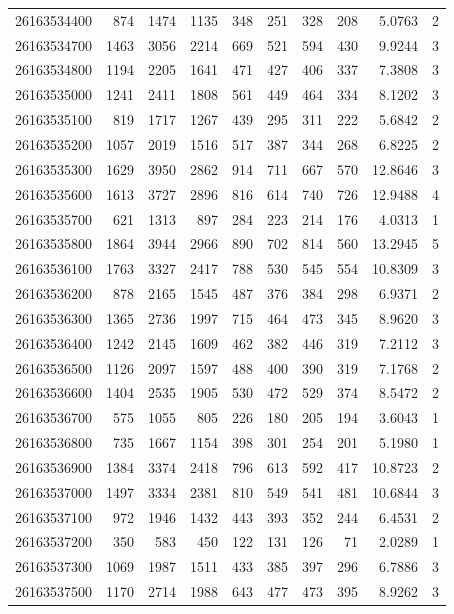 \documentclass[
  11pt,
]{article}
\begin{document}
\begin{longtable}[t]{lrrrrrrrrr}
26163534400 & 874 & 1474 & 1135 & 348 & 251 & 328 & 208 & 5.0763 & 2\\
26163534700 & 1463 & 3056 & 2214 & 669 & 521 & 594 & 430 & 9.9244 & 3\\
26163534800 & 1194 & 2205 & 1641 & 471 & 427 & 406 & 337 & 7.3808 & 3\\
26163535000 & 1241 & 2411 & 1808 & 561 & 449 & 464 & 334 & 8.1202 & 3\\
26163535100 & 819 & 1717 & 1267 & 439 & 295 & 311 & 222 & 5.6842 & 2\\
26163535200 & 1057 & 2019 & 1516 & 517 & 387 & 344 & 268 & 6.8225 & 2\\
26163535300 & 1629 & 3950 & 2862 & 914 & 711 & 667 & 570 & 12.8646 & 3\\
26163535600 & 1613 & 3727 & 2896 & 816 & 614 & 740 & 726 & 12.9488 & 4\\
26163535700 & 621 & 1313 & 897 & 284 & 223 & 214 & 176 & 4.0313 & 1\\
26163535800 & 1864 & 3944 & 2966 & 890 & 702 & 814 & 560 & 13.2945 & 5\\
26163536100 & 1763 & 3327 & 2417 & 788 & 530 & 545 & 554 & 10.8309 & 3\\
26163536200 & 878 & 2165 & 1545 & 487 & 376 & 384 & 298 & 6.9371 & 2\\
26163536300 & 1365 & 2736 & 1997 & 715 & 464 & 473 & 345 & 8.9620 & 3\\
26163536400 & 1242 & 2145 & 1609 & 462 & 382 & 446 & 319 & 7.2112 & 3\\
26163536500 & 1126 & 2097 & 1597 & 488 & 400 & 390 & 319 & 7.1768 & 2\\
26163536600 & 1404 & 2535 & 1905 & 530 & 472 & 529 & 374 & 8.5472 & 2\\
26163536700 & 575 & 1055 & 805 & 226 & 180 & 205 & 194 & 3.6043 & 1\\
26163536800 & 735 & 1667 & 1154 & 398 & 301 & 254 & 201 & 5.1980 & 1\\
26163536900 & 1384 & 3374 & 2418 & 796 & 613 & 592 & 417 & 10.8723 & 2\\
26163537000 & 1497 & 3334 & 2381 & 810 & 549 & 541 & 481 & 10.6844 & 3\\
26163537100 & 972 & 1946 & 1432 & 443 & 393 & 352 & 244 & 6.4531 & 2\\
26163537200 & 350 & 583 & 450 & 122 & 131 & 126 & 71 & 2.0289 & 1\\
26163537300 & 1069 & 1987 & 1511 & 433 & 385 & 397 & 296 & 6.7886 & 3\\
26163537500 & 1170 & 2714 & 1988 & 643 & 477 & 473 & 395 & 8.9262 & 3\\

\end{longtable}
\end{document}
